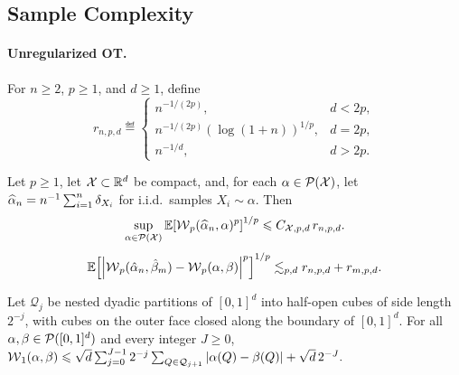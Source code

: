 \subsection{Sample Complexity}
\label{sec-sample-complexity}
\paragraph{Unregularized OT.}
For \(n\geq2\), \(p\geq1\), and \(d\geq1\), define
\begin{equation}\label{eq-empirical-wasserstein-scale}
r_{n,p,d}
\eqdef
\begin{cases}
n^{-1/(2p)}, & d<2p,\\
n^{-1/(2p)}(\log(1+n))^{1/p}, & d=2p,\\
n^{-1/d}, & d>2p.
\end{cases}
\end{equation}
\begin{prop}\label{prop-empirical-ot-rate}
Let \(p\geq1\), let \(\mathcal{X}\subset\mathbb{R}^d\) be compact, and, for each \(\alpha\in\mathcal{P}(\mathcal{X})\), let \(\widehat\alpha_n=n^{-1}\sum_{i=1}^n\delta_{X_i}\) for i.i.d.\ samples \(X_i\sim\alpha\). Then
\begin{equation}\label{eq-empirical-wasserstein-moment-scale}
\sup_{\alpha\in\mathcal{P}(\mathcal{X})}
\mathbb{E}\!\left[\operatorname{\mathcal{W}}_p(\widehat\alpha_n,\alpha)^p\right]^{1/p}
\leqslant
C_{\mathcal{X},p,d}\,r_{n,p,d}.
\end{equation}
\[
\mathbb{E}\!\left[
\left\lvert\operatorname{\mathcal{W}}_p(\hat\alpha_n,\hat\beta_m)-\operatorname{\mathcal{W}}_p(\alpha,\beta)\right\rvert^p
\right]^{1/p}
\lesssim_{p,d}
r_{n,p,d}+r_{m,p,d}.
\]
\end{prop}
\begin{prop}\label{prop-dyadic-partition-w1}
Let \(\mathcal Q_j\) be nested dyadic partitions of \([0,1]^d\) into half-open cubes of side length \(2^{-j}\), with cubes on the outer face closed along the boundary of \([0,1]^d\). For all \(\alpha,\beta\in\mathcal{P}([0,1]^d)\) and every integer \(J\geq0\),
\(\operatorname{\mathcal{W}}_1(\alpha,\beta) \leqslant \sqrt d \sum_{j=0}^{J-1}2^{-j} \sum_{Q\in\mathcal Q_{j+1}}\left\lvert\alpha(Q)-\beta(Q)\right\rvert + \sqrt d\,2^{-J}.\)
\end{prop}
